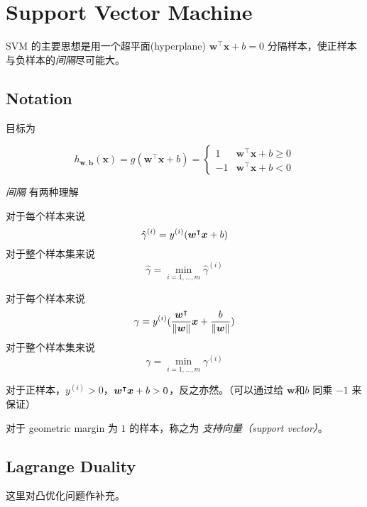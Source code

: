 \section{Support Vector Machine}
	SVM 的主要思想是用一个超平面(hyperplane) $ \bm{w}^\intercal \bm{x} + b = 0 $ 分隔样本，使正样本与负样本的\emph{间隔}尽可能大。
	
	\subsection{Notation}
	目标为
	\begin{df}
		\begin{equation*}
			h_{\bm{w},\bm{b}} (\bm{x}) = g( \bm{w}^\intercal \bm{x} + b ) = 
			\begin{cases}
				1 	& \bm{w}^\intercal \bm{x} + b \geq 0 \\
				-1 	& \bm{w}^\intercal \bm{x} + b < 0
			\end{cases}
		\end{equation*}			
	\end{df}
	
	\emph{间隔} 有两种理解
	\begin{df}
		对于每个样本来说
		\begin{equation*}
			\hat{\gamma}^{(i)} = y^{(i)} (\bm{w^}\intercal \bm{x} + b)
		\end{equation*}
		对于整个样本集来说
		\begin{equation*}
			\hat{\gamma} = \min_{i=1,\ldots,m}{\hat{\gamma}^{(i)}}
		\end{equation*}
	\end{df}
	\begin{df}
		对于每个样本来说
		\begin{equation*}
			\gamma = y^{(i)} (\frac{\bm{w^}\intercal}{\| \bm{w} \|} \bm{x} + \frac{b}{\| \bm{w} \|})			
		\end{equation*}
		对于整个样本集来说
			\begin{equation*}
				\gamma = \min_{i=1,\ldots,m}{\gamma^{(i)}}
			\end{equation*}	
	\end{df}
	
	对于正样本，$ y^{(i)} > 0 $，$ \bm{w^}\intercal \bm{x} + b > 0$，反之亦然。（可以通过给 $ \bm{w} \text{和} b$ 同乘 $ -1 $ 来保证）
	
	对于 geometric margin 为 $ 1 $ 的样本，称之为 \emph{支持向量（support vector）}。
	
	\subsection{Lagrange Duality}
	这里对凸优化问题作补充。
	
